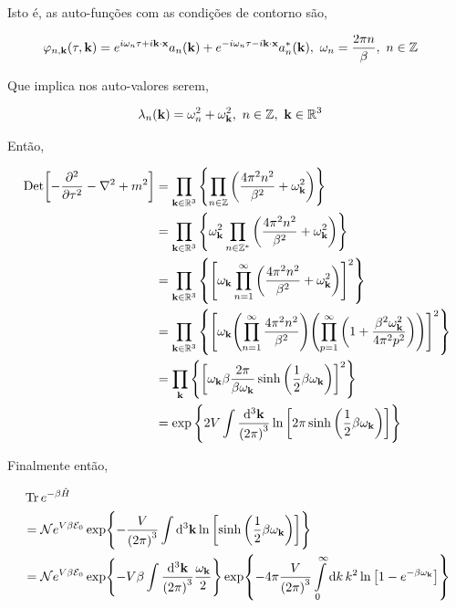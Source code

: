 \documentclass[twoside]{amsart}
\newcommand{\Det}[1]{\textup{Det} #1}
\numberwithin{equation}{section}
\begin{document}
Isto é, as auto-funções com as condições de contorno são,

\begin{align}
    \varphi_{n,\vb k}\qty(\tau,\vb k)&=e^{i\omega_n\tau+i\vb k\cdot\vb x}a_n\qty(\vb k)+e^{-i\omega_n\tau-i\vb k\cdot\vb x}a_n^\ast\qty(\vb k),\ \omega_n=\frac{2\pi n}{\beta},\ n\in\mathbb Z
\end{align}

Que implica nos auto-valores serem,

\begin{align}
    \lambda_n\qty(\vb k)&=\omega_n^2+\omega_{\vb k}^2,\ n\in\mathbb Z,\ \vb k \in\mathbb R^3
\end{align}

Então,

\begin{align}
     \Det\qty[-\pdv[2]{\tau}-\laplacian+m^2] &=\prod\limits_{\vb k\in\mathbb R^3}\qty{\prod\limits_{n\in\mathbb Z}\qty(\frac{4\pi^2n^2}{\beta^2}+\omega_{\vb k}^2)}\\
     &=\prod\limits_{\vb k\in\mathbb R^3}\qty{\omega_{\vb k}^2\prod\limits_{n\in\mathbb Z^\ast}\qty(\frac{4\pi^2n^2}{\beta^2}+\omega_{\vb k}^2)}\\
     &=\prod\limits_{\vb k\in\mathbb R^3}\qty{\qty[\omega_{\vb k}\prod\limits_{n=1}^{\infty}\qty(\frac{4\pi^2n^2}{\beta^2}+\omega_{\vb k}^2)]^2}\\
     &=\prod\limits_{\vb k\in\mathbb R^3}\qty{\qty[\omega_{\vb k}\qty(\prod\limits_{n=1}^{\infty}\frac{4\pi^2n^2}{\beta^2})\qty(\prod\limits_{p=1}^{\infty}\qty(1+\frac{\beta^2\omega_{\vb k}^2}{4\pi^2p^2}))]^2}\\
     &=\prod\limits_{\vb k}\qty{\qty[\omega_{\vb k}\beta\frac{2\pi}{\beta\omega_{\vb k}}\sinh\qty(\frac12\beta\omega_{\vb k})]^2}\\
     &=\exp\qty{2V\int\frac{\dd[3]{\vb k}}{\qty(2\pi)^3}\ln\qty[2\pi\sinh\qty(\frac12\beta\omega_{\vb k})]}
\end{align}

Finalmente então,

\begin{align}
    &\Tr e^{-\beta\hat H}\\
    &=\mathcal Ne^{V\beta\mathcal E_0}\exp{-\frac{V}{\qty(2\pi)^3}\int\dd[3]{\vb k}\ln\qty[\sinh\qty(\frac12\beta\omega_{\vb k})]}\\
    &=\mathcal Ne^{V\beta\mathcal E_0}\exp{-V\beta\int\frac{\dd[3]{\vb k}}{\qty(2\pi)^3}\frac{\omega_{\vb k}}{2}}\exp{-4\pi\frac{V}{\qty(2\pi)^3}\int\limits_0^\infty\dd{ k}k^2\ln\qty[1-e^{-\beta\omega_{\vb k}}]}
\end{align}
\end{document}
